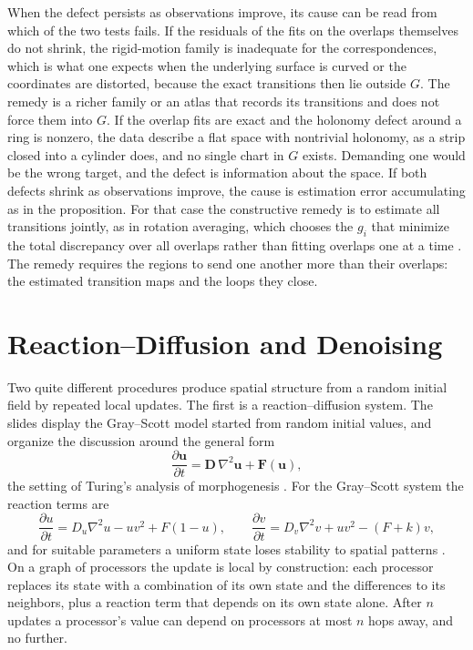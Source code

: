 \documentclass[11pt]{article}
\theoremstyle{definition}
\theoremstyle{plain}
\theoremstyle{remark}
\newcommand{\bu}{\mathbf{u}}
\begin{document}
When the defect persists as observations improve, its cause can be read from which of the two tests fails. If the residuals of the fits on the overlaps themselves do not shrink, the rigid-motion family is inadequate for the correspondences, which is what one expects when the underlying surface is curved or the coordinates are distorted, because the exact transitions then lie outside $G$. The remedy is a richer family or an atlas that records its transitions and does not force them into $G$. If the overlap fits are exact and the holonomy defect around a ring is nonzero, the data describe a flat space with nontrivial holonomy, as a strip closed into a cylinder does, and no single chart in $G$ exists. Demanding one would be the wrong target, and the defect is information about the space. If both defects shrink as observations improve, the cause is estimation error accumulating as in the proposition. For that case the constructive remedy is to estimate all transitions jointly, as in rotation averaging, which chooses the $g_i$ that minimize the total discrepancy over all overlaps rather than fitting overlaps one at a time \cite{hartley2013}. The remedy requires the regions to send one another more than their overlaps: the estimated transition maps and the loops they close.

\section{Reaction--Diffusion and Denoising}\label{sec:rd}

Two quite different procedures produce spatial structure from a random initial field by repeated local updates. The first is a reaction--diffusion system. The slides display the Gray--Scott model started from random initial values, and organize the discussion around the general form
\[
\frac{\partial\bu}{\partial t}=\mathbf D\,\nabla^{2}\bu+\mathbf F(\bu),
\]
the setting of Turing's analysis of morphogenesis \cite{turing1952,darpa1998}. For the Gray--Scott system the reaction terms are
\[
\frac{\partial u}{\partial t}=D_u\nabla^2u-uv^2+F(1-u),\qquad
\frac{\partial v}{\partial t}=D_v\nabla^2v+uv^2-(F+k)v,
\]
and for suitable parameters a uniform state loses stability to spatial patterns \cite{grayscott1984}. On a graph of processors the update is local by construction: each processor replaces its state with a combination of its own state and the differences to its neighbors, plus a reaction term that depends on its own state alone. After $n$ updates a processor's value can depend on processors at most $n$ hops away, and no further.
\end{document}
